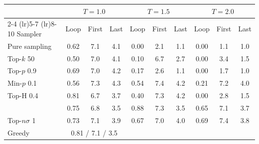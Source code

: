 \begin{tabular}{lccccccccc}
\toprule
 & \multicolumn{3}{c}{$T{=}1.0$} & \multicolumn{3}{c}{$T{=}1.5$} & \multicolumn{3}{c}{$T{=}2.0$} \\
\cmidrule(lr){2-4} \cmidrule(lr){5-7} \cmidrule(lr){8-10}
Sampler & Loop & First & Last & Loop & First & Last & Loop & First & Last \\
\midrule
Pure sampling & 0.62 & 7.1 & 4.1 & 0.00 & 2.1 & 1.1 & 0.00 & 1.1 & 1.0 \\
Top-$k$ 50 & 0.50 & 7.0 & 4.1 & 0.10 & 6.7 & 2.7 & 0.00 & 3.4 & 1.5 \\
Top-$p$ 0.9 & 0.69 & 7.0 & 4.2 & 0.17 & 2.6 & 1.1 & 0.00 & 1.7 & 1.0 \\
Min-$p$ 0.1 & 0.56 & 7.3 & 4.3 & 0.54 & 7.4 & 4.2 & 0.21 & 7.2 & 4.0 \\
Top-H 0.4 & 0.81 & 6.7 & 3.7 & 0.40 & 7.3 & 4.2 & 0.00 & 2.8 & 1.5 \\
\pless{} & 0.75 & 6.8 & 3.5 & 0.88 & 7.3 & 3.5 & 0.65 & 7.1 & 3.7 \\
Top-$n\sigma$ 1 & 0.73 & 7.1 & 3.9 & 0.67 & 7.0 & 4.0 & 0.69 & 7.4 & 3.8 \\
\midrule
Greedy & \multicolumn{3}{c}{0.81 / 7.1 / 3.5} &  &  &  &  &  &  \\
\bottomrule
\end{tabular}
